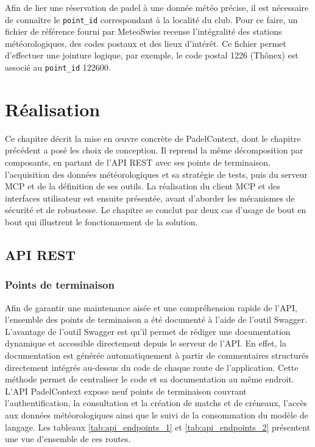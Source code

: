 \documentclass[12pt]{article}
\let\stdsection\section
\renewcommand{\section}{\clearpage\stdsection}
\begin{document}
Afin de lier une réservation de padel à une donnée météo précise, il est nécessaire de connaître le \texttt{point\_id} correspondant à la localité du club. Pour ce faire, un fichier de référence fourni par MeteoSwiss recense l'intégralité des stations météorologiques, des codes postaux et des lieux d'intérêt. Ce fichier permet d'effectuer une jointure logique, par exemple, le code postal 1226 (Thônex) est associé au \texttt{point\_id} 122600. 

\section{Réalisation}
Ce chapitre décrit la mise en œuvre concrète de PadelContext, dont le chapitre précédent a posé les choix de conception. Il reprend la même décomposition par composants, en partant de l'API REST avec ses points de terminaison, l'acquisition des données météorologiques et sa stratégie de tests, puis du serveur MCP et de la définition de ses outils. La réalisation du client MCP et des interfaces utilisateur est ensuite présentée, avant d'aborder les mécanismes de sécurité et de robustesse. Le chapitre se conclut par deux cas d'usage de bout en bout qui illustrent le fonctionnement de la solution.
\subsection{API REST}
\subsubsection{Points de terminaison}
Afin de garantir une maintenance aisée et une compréhension rapide de l'API, l'ensemble des points de terminaison a été documenté à l'aide de l'outil Swagger.
\newline\newline
L'avantage de l'outil Swagger est qu'il permet de rédiger une documentation dynamique et accessible directement depuis le serveur de l'API. En effet, la documentation est générée automatiquement à partir de commentaires structurés directement intégrés au-dessus du code de chaque route de l'application. Cette méthode permet de centraliser le code et sa documentation au même endroit.
\newline\newline
L'API PadelContext expose neuf points de terminaison couvrant l'authentification, la consultation et la création de matchs et de créneaux, l'accès aux données météorologiques ainsi que le suivi de la consommation du modèle de langage. Les tableaux \ref{tab:api_endpoints_1} et \ref{tab:api_endpoints_2} présentent une vue d'ensemble de ces routes.
\end{document}
